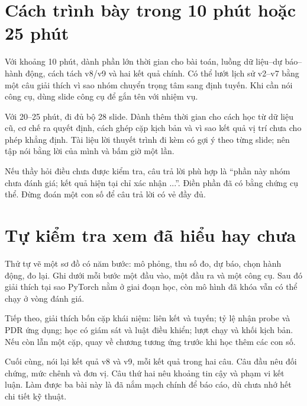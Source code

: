 \section{Cách trình bày trong 10 phút hoặc 25 phút}
Với khoảng 10 phút, dành phần lớn thời gian cho bài toán, luồng dữ liệu--dự báo--hành động, cách tách v8/v9 và hai kết quả chính. Có thể lướt lịch sử v2--v7 bằng một câu giải thích vì sao nhóm chuyển trọng tâm sang định tuyến. Khi cần nói công cụ, dùng slide công cụ để gắn tên với nhiệm vụ.

Với 20--25 phút, đi đủ bộ 28 slide. Dành thêm thời gian cho cách học từ dữ liệu cũ, cơ chế ra quyết định, cách ghép cặp kịch bản và vì sao kết quả vị trí chưa cho phép khẳng định. Tài liệu lời thuyết trình đi kèm có gợi ý theo từng slide; nên tập nói bằng lời của mình và bấm giờ một lần.

Nếu thầy hỏi điều chưa được kiểm tra, câu trả lời phù hợp là ``phần này nhóm chưa đánh giá; kết quả hiện tại chỉ xác nhận ...''. Điền phần đã có bằng chứng cụ thể. Đừng đoán một con số để câu trả lời có vẻ đầy đủ.

\section{Tự kiểm tra xem đã hiểu hay chưa}
Thử tự vẽ một sơ đồ có năm bước: mô phỏng, thu số đo, dự báo, chọn hành động, đo lại. Ghi dưới mỗi bước một đầu vào, một đầu ra và một công cụ. Sau đó giải thích tại sao PyTorch nằm ở giai đoạn học, còn mô hình đã khóa vẫn có thể chạy ở vòng đánh giá.

Tiếp theo, giải thích bốn cặp khái niệm: liên kết và tuyến; tỷ lệ nhận probe và PDR ứng dụng; học có giám sát và luật điều khiển; lượt chạy và khối kịch bản. Nếu còn lẫn một cặp, quay về chương tương ứng trước khi học thêm các con số.

Cuối cùng, nói lại kết quả v8 và v9, mỗi kết quả trong hai câu. Câu đầu nêu đối chứng, mức chênh và đơn vị. Câu thứ hai nêu khoảng tin cậy và phạm vi kết luận. Làm được ba bài này là đã nắm mạch chính để báo cáo, dù chưa nhớ hết chi tiết kỹ thuật.

\clearpage
